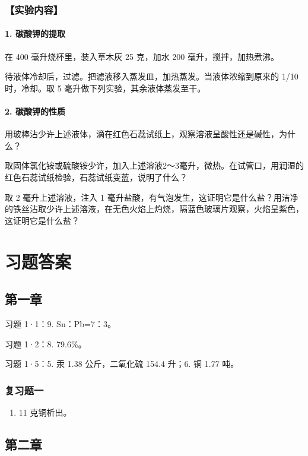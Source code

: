 \subsection{【实验内容】}

\subsubsection{1. 碳酸钾的提取}

在 400 毫升烧杯里，装入草木灰 25 克，加水 200 毫升，搅拌，加热煮沸。

待液体冷却后，过滤。把滤液移入蒸发皿，加热蒸发。当液体浓缩到原来的 1/10
时，冷却。取 5 毫升做下列实验，其余液体蒸发至干。

\subsubsection{2. 碳酸钾的性质}

用玻棒沾少许上述液体，滴在红色石蕊试纸上，观察溶液呈酸性还是碱性，为什么？

取固体氯化铵或硫酸铵少许，加入上述溶液2～3毫升，微热。在试管口，用润湿的红色石蕊试纸检验，石蕊试纸变蓝，说明了什么？

取 2 毫升上述溶液，注入 1
毫升盐酸，有气泡发生，这证明它是什么盐？用洁净的铁丝沾取少许上述溶液，在无色火焰上灼烧，隔蓝色玻璃片观察，火焰呈紫色，这证明它是什么盐？

\chapter{习题答案}

\section{第一章}

习题 1·1：9. Sn：Pb=7：3。

习题 1·2：8. 79.6\%。

习题 1·5：5. 汞 1.38 公斤，二氧化硫 154.4 升；6. 铜 1.77 吨。

\subsection{复习题一}

\begin{enumerate}[start=6]
\item
  11 克铜析出。
\end{enumerate}

\section{第二章}

